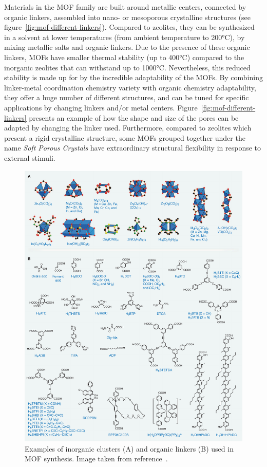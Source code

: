 \documentclass[thesis]{subfiles}
\begin{document}
Materials in the MOF family are built around metallic centers, connected by
organic linkers, assembled into nano- or mesoporous crystalline structures (see
figure~\ref{fig:mof-different-linkers}). Compared to zeolites, they can be
synthesized in a solvent at lower temperatures (from ambient temperature to
200°C), by mixing metallic salts and organic linkers. Due to the presence of
these organic linkers, MOFs have smaller thermal stability (up to 400°C)
compared to the inorganic zeolites that can withstand up to 1000°C.
Nevertheless, this reduced stability is made up for by the incredible
adaptability of the MOFs. By combining linker-metal coordination chemistry
variety with organic chemistry adaptability, they offer a huge number of
different structures, and can be tuned for specific applications by changing
linkers and/or metal centers. Figure~\ref{fig:mof-different-linkers} presents an
example of how the shape and size of the pores can be adapted by changing the
linker used. Furthermore, compared to zeolites which present a rigid crystalline
structure, some MOFs grouped together under the name \emph{Soft Porous
Crystals}\cite{Horike2009} have extraordinary structural flexibility in
response to external stimuli\cite{Kitagawa2005, Bradshaw2005, Coudert2015}.

\begin{figure}[p]
    \centering
    \includegraphics[width=\textwidth]{figures/cited/mof-building-blocks}
    \caption{Examples of inorganic clusters (A) and organic linkers (B) used in
    MOF synthesis. Image taken from reference~\cite{Furukawa2013}.}
    \label{fig:mof-building-blocks}
\end{figure}
\end{document}
